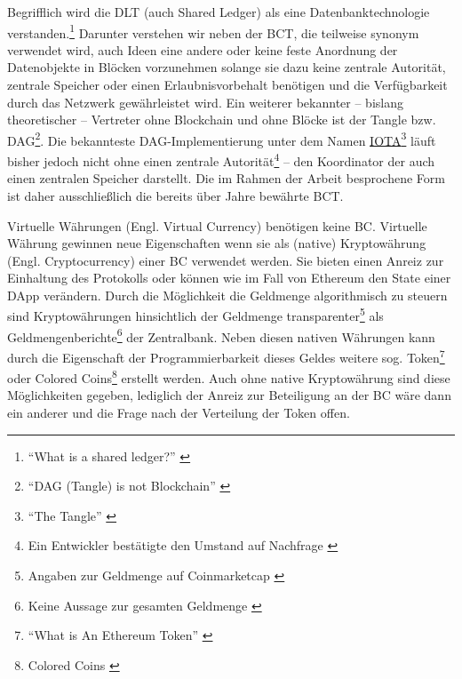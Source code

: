 Begrifflich wird die \gls{DLT} (auch Shared Ledger) als eine Datenbanktechnologie verstanden.\footnote{\enquote{What is a shared ledger?} \autocite{b:gos-dlt}}
Darunter verstehen wir neben der \gls{BCT}, die teilweise synonym verwendet wird, auch Ideen eine andere oder keine feste Anordnung der Datenobjekte in Blöcken vorzunehmen solange sie dazu keine zentrale Autorität, zentrale Speicher oder einen Erlaubnisvorbehalt benötigen und die Verfügbarkeit durch das Netzwerk gewährleistet wird.
Ein weiterer bekannter -- bislang theoretischer -- Vertreter ohne Blockchain und ohne Blöcke ist der Tangle bzw. \gls{DAG}\footnote{\enquote{DAG (Tangle) is not Blockchain} \autocite{w:satoshiwatch-dag}}.
Die bekannteste \gls{DAG}-Implementierung unter dem Namen \href{https://iota.org/}{IOTA}\footnote{\enquote{The Tangle} \autocite{p:iota}} läuft bisher jedoch nicht ohne einen zentrale Autorität\footnote{Ein Entwickler bestätigte den Umstand auf Nachfrage \autocite{w:iota-centralized}} -- den Koordinator der auch einen zentralen Speicher darstellt.
Die im Rahmen der Arbeit besprochene Form ist daher ausschließlich die bereits über Jahre bewährte \gls{BCT}.

Virtuelle Währungen (Engl. Virtual Currency) benötigen keine \gls{BC}.
Virtuelle Währung gewinnen neue Eigenschaften wenn sie als (native) Kryptowährung (Engl. Cryptocurrency) einer \gls{BC} verwendet werden.
Sie bieten einen Anreiz zur Einhaltung des Protokolls oder können wie im Fall von Ethereum den State einer \gls{DApp} verändern.
Durch die Möglichkeit die Geldmenge algorithmisch zu steuern sind Kryptowährungen hinsichtlich der Geldmenge transparenter\footnote{Angaben zur Geldmenge \zB{} auf Coinmarketcap \autocite{w:cmc}} als Geldmengenberichte\footnote{Keine Aussage zur gesamten Geldmenge \autocite{w:ecb-moneydev}} der Zentralbank.
Neben diesen nativen Währungen kann \ua{} durch die Eigenschaft der Programmierbarkeit dieses Geldes weitere sog. Token\footnote{\enquote{What is An Ethereum Token} \autocite{w:eth-token}} oder Colored Coins\footnote{Colored Coins \autocite{b:mastering-bitcoin}%
} erstellt werden.
Auch ohne native Kryptowährung sind diese Möglichkeiten gegeben, lediglich der Anreiz zur Beteiligung an der \gls{BC} wäre dann ein anderer und die Frage nach der Verteilung der Token offen.

